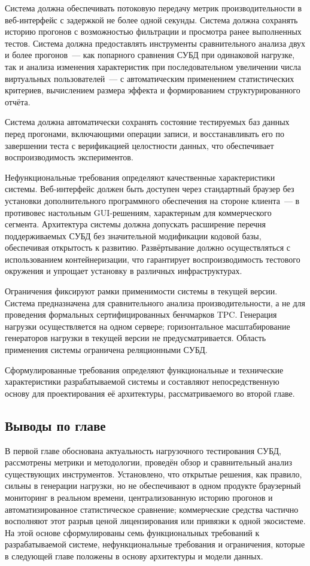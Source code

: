 Система должна обеспечивать потоковую передачу метрик производительности в веб-интерфейс с задержкой не более одной секунды. Система должна сохранять историю прогонов с возможностью фильтрации и просмотра ранее выполненных тестов. Система должна предоставлять инструменты сравнительного анализа двух и более прогонов~--- как попарного сравнения СУБД при одинаковой нагрузке, так и анализа изменения характеристик при последовательном увеличении числа виртуальных пользователей~--- с автоматическим применением статистических критериев, вычислением размера эффекта и формированием структурированного отчёта.

Система должна автоматически сохранять состояние тестируемых баз данных перед прогонами, включающими операции записи, и восстанавливать его по завершении теста с верификацией целостности данных, что обеспечивает воспроизводимость экспериментов.

Нефункциональные требования определяют качественные характеристики системы. Веб-интерфейс должен быть доступен через стандартный браузер без установки дополнительного программного обеспечения на стороне клиента~--- в противовес настольным GUI-решениям, характерным для коммерческого сегмента. Архитектура системы должна допускать расширение перечня поддерживаемых СУБД без значительной модификации кодовой базы, обеспечивая открытость к развитию. Развёртывание должно осуществляться с использованием контейнеризации, что гарантирует воспроизводимость тестового окружения и упрощает установку в различных инфраструктурах.

Ограничения фиксируют рамки применимости системы в текущей версии. Система предназначена для сравнительного анализа производительности, а не для проведения формальных сертифицированных бенчмарков TPC. Генерация нагрузки осуществляется на одном сервере; горизонтальное масштабирование генераторов нагрузки в текущей версии не предусматривается. Область применения системы ограничена реляционными СУБД.

Сформулированные требования определяют функциональные и технические характеристики разрабатываемой системы и составляют непосредственную основу для проектирования её архитектуры, рассматриваемого во второй главе.

\subsection{Выводы по главе}

В первой главе обоснована актуальность нагрузочного тестирования СУБД, рассмотрены метрики и методологии, проведён обзор и сравнительный анализ существующих инструментов. Установлено, что открытые решения, как правило, сильны в генерации нагрузки, но не обеспечивают в одном продукте браузерный мониторинг в реальном времени, централизованную историю прогонов и автоматизированное статистическое сравнение; коммерческие средства частично восполняют этот разрыв ценой лицензирования или привязки к одной экосистеме. На этой основе сформулированы семь функциональных требований к разрабатываемой системе, нефункциональные требования и ограничения, которые в следующей главе положены в основу архитектуры и модели данных.